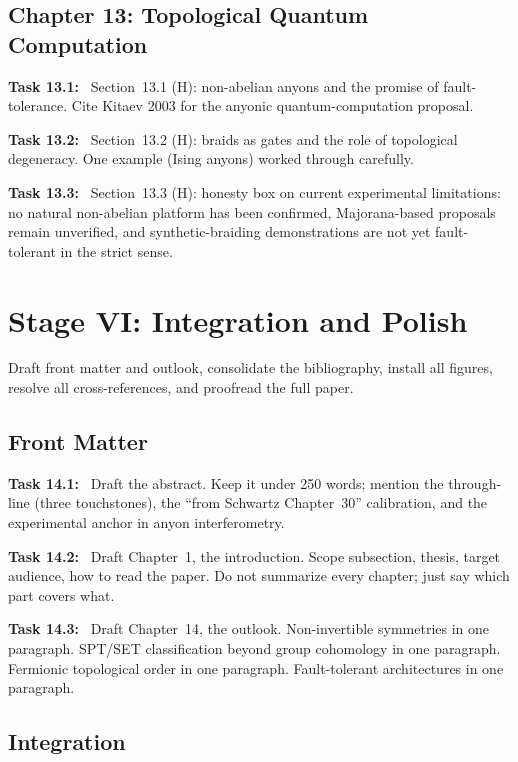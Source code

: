 \documentclass[11pt]{article}
\newcommand{\task}[1]{\medskip\noindent\textbf{Task #1:}\ }
\begin{document}
\subsection{Chapter 13: Topological Quantum Computation}

\task{13.1} Section~13.1 (H): non-abelian anyons and the promise of fault-tolerance.
Cite Kitaev 2003 for the anyonic quantum-computation proposal.

\task{13.2} Section~13.2 (H): braids as gates and the role of topological degeneracy.
One example (Ising anyons) worked through carefully.

\task{13.3} Section~13.3 (H): honesty box on current experimental limitations: no
natural non-abelian platform has been confirmed, Majorana-based proposals remain unverified,
and synthetic-braiding demonstrations are not yet fault-tolerant in the strict sense.

\section{Stage VI: Integration and Polish}\label{sec:stageVI}

\begin{goalbox}[Objective]
Draft front matter and outlook, consolidate the bibliography, install all figures,
resolve all cross-references, and proofread the full paper.
\end{goalbox}

\subsection{Front Matter}

\task{14.1} Draft the abstract. Keep it under 250 words; mention the through-line
(three touchstones), the ``from Schwartz Chapter~30'' calibration, and the experimental
anchor in anyon interferometry.

\task{14.2} Draft Chapter~1, the introduction. Scope subsection, thesis, target audience,
how to read the paper. Do not summarize every chapter; just say which part covers what.

\task{14.3} Draft Chapter~14, the outlook. Non-invertible symmetries in one paragraph.
SPT/SET classification beyond group cohomology in one paragraph. Fermionic topological
order in one paragraph. Fault-tolerant architectures in one paragraph.

\subsection{Integration}
\end{document}
